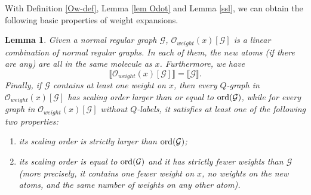 \documentclass{article}
\newcommand{\1}{\mathds{1}}
\numberwithin{equation}{section}
\newcommand{\ord}{{\rm{ord}}}
\renewcommand{\cal}{\mathcal}
\theoremstyle{plain} %
\newtheorem{lemma}[theorem]{Lemma}
\theoremstyle{remark}
\begin{document}
With Definition \ref{Ow-def}, Lemma \ref{lem Odot} and Lemma \ref{ssl}, we can obtain the following basic properties of weight expansions.

  \begin{lemma}\label{expandlabel}
Given a normal regular graph $\cal G$, ${\cal O}_{weight}(x)[\cal G]$ is a linear combination of normal regular graphs. In each of them, the new atoms (if there are any) are all in the same molecule as $x$. Furthermore, we have $$ \llbracket {\cal O}_{weight}(x)[\cal G]\rrbracket  =\llbracket \cal G\rrbracket.$$  Finally, if $\cal G$ contains at least one weight on $x$, then every $Q$-graph in ${\cal O}_{weight}(x)[\cal G]$ has scaling order larger than or equal to $\ord(\cal G)$, while for every graph in ${\cal O}_{weight}(x)[\cal G]$ without $Q$-labels, it satisfies at least one of the following two properties:
\begin{enumerate}
\item its scaling order is strictly larger than $\ord(\cal G)$;
\item its scaling order is equal to $\ord(\cal G)$ and it has strictly fewer weights than $\cal G$ (more precisely, it contains one fewer weight on $x$, no weights on the new atoms, and the same number of weights on any other atom).
\end{enumerate}

  \end{lemma}
\end{document}
